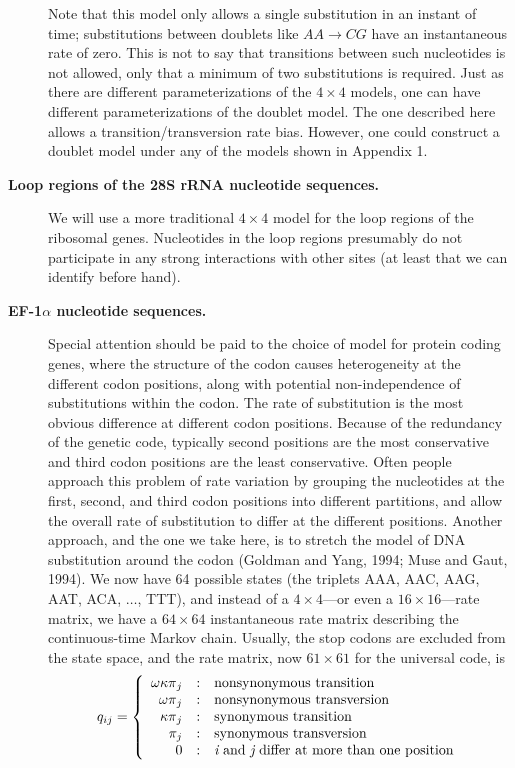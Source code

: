 \documentclass{svmult}
\begin{document}
\begin{description}
Note that this model only allows a single substitution in an instant of time; substitutions between
doublets like $AA \rightarrow CG$ have an instantaneous rate of zero.  This is not to say
that transitions between such nucleotides is not allowed, only that a minimum of two
substitutions is required. Just as there are different parameterizations of the $4 \times
4$ models, one can have different parameterizations of the doublet model. The one described
here allows a transition/transversion rate bias. However, one could construct a doublet
model under any of the models shown in Appendix 1. \\

\item[ {\bf Loop regions of the 28S rRNA nucleotide sequences.}] We will use a more traditional $4
\times 4$ model for the loop regions of the ribosomal genes. Nucleotides in the loop regions
presumably do not participate in any strong interactions with other sites (at least that we
can identify before hand). \\

\item[ {\bf EF-1$\alpha$ nucleotide sequences.}] Special attention should be paid to the choice of
model for protein coding genes, where the structure of the codon causes heterogeneity at the
different codon positions, along with potential non-independence of substitutions within
the codon. The rate of substitution is the most obvious difference at different codon
positions. Because of the redundancy of the genetic code, typically second positions are
the most conservative and third codon positions are the least conservative. Often people
approach this problem of rate variation by grouping the nucleotides at the first, second,
and third codon positions into different partitions, and allow the overall rate of
substitution to differ at the different positions. Another approach, and the one we take
here, is to stretch the model of DNA substitution around the codon (Goldman and Yang, 1994;
Muse and Gaut, 1994). We now have 64 possible states (the triplets AAA, AAC, AAG, AAT, ACA,
$\ldots$, TTT), and instead of a $4 \times 4$---or even a $16 \times 16$---rate matrix, we
have a $64 \times 64$ instantaneous rate matrix describing the continuous-time Markov
chain.  Usually, the stop codons are excluded from the state space, and the rate matrix,
now $61 \times 61$ for the universal code, is
$$
q_{ij} = \left\{
   \begin{array}{r@{\quad:\quad}l}
      {\omega \kappa \pi}_j & \mbox{nonsynonymous transition}                             \\
      {\omega        \pi}_j & \mbox{nonsynonymous transversion}                           \\    
      {       \kappa \pi}_j & \mbox{synonymous transition}                                \\    
      {              \pi}_j & \mbox{synonymous transversion}                              \\
      0                    & \mbox{{\it i} and {\it j} differ at more than one position} 
   \end{array}
\right.
$$


\end{description}
\end{document}
